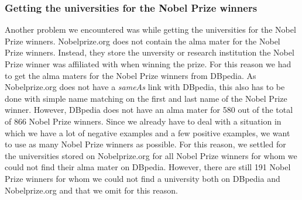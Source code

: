 \subsubsection{Getting the universities for the Nobel Prize winners}

Another problem we encountered was while getting the universities for the Nobel Prize winners. Nobelprize.org does not contain the alma mater for the Nobel Prize winners. Instead, they store the unversity or research institution the Nobel Prize winner was affiliated with when winning the prize. For this reason we had to get the alma maters for the Nobel Prize winners from DBpedia. As Nobelprize.org does not have a \textit{sameAs} link with DBpedia, this also has to be done with simple name matching on the first and last name of the Nobel Prize winner.
However, DBpedia does not have an alma mater for 580 out of the total of 866 Nobel Prize winners. Since we already have to deal with a situation in which we have a lot of negative examples and a few positive examples, we want to use as many Nobel Prize winners as possible. For this reason, we settled for the universities stored on Nobelprize.org for all Nobel Prize winners for whom we could not find their alma mater on DBpedia.
However, there are still 191 Nobel Prize winners for whom we could not find a university both on DBpedia and Nobelprize.org and that we omit for this reason.
